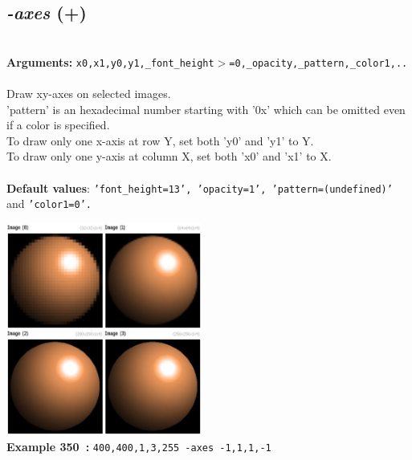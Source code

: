 \documentclass[a4paper,11pt,twoside]{book}
\begin{document}
\subsection{\emph{-axes} (+)}\vspace*{-0.5em}
~\\\textbf{Arguments: } 
{\small \texttt{x0,x1,y0,y1,\_font\_height$>$=0,\_opacity,\_pattern,\_color1,..}}\\~\\
Draw xy-axes on selected images.
~\\'pattern' is an hexadecimal number starting with '0x' which can be omitted
even if a color is specified.
~\\To draw only one x-axis at row Y, set both 'y0' and 'y1' to Y.
~\\To draw only one y-axis at column X, set both 'x0' and 'x1' to X.
~\\~\\\textbf{Default values}: {\small \texttt{'font\_height=13', 'opacity=1', 'pattern=(undefined)'} and \texttt{'color1=0'.}}
\begin{center}\includegraphics[keepaspectratio=true,height=7cm,width=\textwidth]{img/gmic_def350.jpg}\\
{\footnotesize \textbf{Example 350~:} \texttt{400,400,1,3,255 -axes -1,1,1,-1}}
\end{center}
\end{document}
